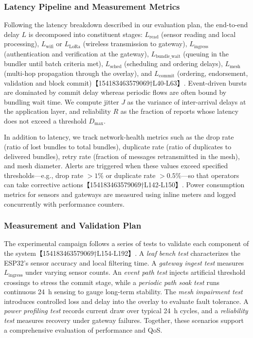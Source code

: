 \subsubsection{Latency Pipeline and Measurement Metrics}
Following the latency breakdown described in our evaluation plan, the end-to-end delay $L$ is decomposed into constituent stages: $L_{\text{read}}$ (sensor reading and local processing), $L_{\text{wifi}}$ or $L_{\text{LoRa}}$ (wireless transmission to gateway), $L_{\text{ingress}}$ (authentication and verification at the gateway), $L_{\text{bundle\_wait}}$ (queuing in the bundler until batch criteria met), $L_{\text{sched}}$ (scheduling and ordering delays), $L_{\text{mesh}}$ (multi-hop propagation through the overlay), and $L_{\text{commit}}$ (ordering, endorsement, validation and block commit)【154183463579069†L40-L63】.  Event-driven bursts are dominated by commit delay whereas periodic flows are often bound by bundling wait time.  We compute jitter $J$ as the variance of inter-arrival delays at the application layer, and reliability $R$ as the fraction of reports whose latency does not exceed a threshold $D_{\max}$.

In addition to latency, we track network-health metrics such as the drop rate (ratio of lost bundles to total bundles), duplicate rate (ratio of duplicates to delivered bundles), retry rate (fraction of messages retransmitted in the mesh), and mesh diameter.  Alerts are triggered when these values exceed specified thresholds—e.g., drop rate $>1\%$ or duplicate rate $>0.5\%$—so that operators can take corrective actions【154183463579069†L142-L150】.  Power consumption metrics for sensors and gateways are measured using inline meters and logged concurrently with performance counters.

\subsubsection{Measurement and Validation Plan}
The experimental campaign follows a series of tests to validate each component of the system【154183463579069†L154-L192】.  A \emph{leaf bench test} characterizes the ESP32's sensor accuracy and local filtering time.  A \emph{gateway ingest test} measures $L_{\text{ingress}}$ under varying sensor counts.  An \emph{event path test} injects artificial threshold crossings to stress the commit stage, while a \emph{periodic path soak test} runs continuous 24~h sensing to gauge long-term stability.  The \emph{mesh impairment test} introduces controlled loss and delay into the overlay to evaluate fault tolerance.  A \emph{power profiling test} records current draw over typical 24~h cycles, and a \emph{reliability test} measures recovery under gateway failures.  Together, these scenarios support a comprehensive evaluation of performance and QoS.


